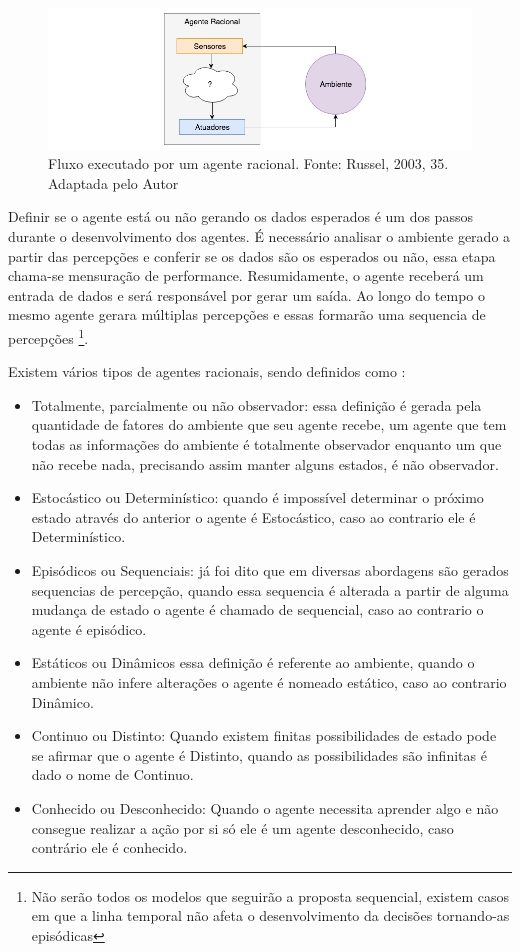 \begin{figure}
    \centering
    \includegraphics[width=.8\textwidth]{imagens/rational_agent_draw.png}
    \caption{Fluxo executado por um agente racional. Fonte: Russel, 2003, 35. Adaptada pelo Autor}
    \label{fig:rational_agent_draw}
\end{figure}

Definir se o agente está ou não gerando os dados esperados é um dos passos durante o desenvolvimento dos agentes. É necessário analisar o ambiente gerado a partir das percepções e conferir se os dados são os esperados ou não, essa etapa chama-se mensuração de performance. Resumidamente, o agente receberá um entrada de dados e será responsável por gerar um saída. Ao longo do tempo o mesmo agente gerara múltiplas percepções e essas formarão uma sequencia de percepções \footnote{Não serão todos os modelos que seguirão a proposta sequencial, existem casos em que a linha temporal não afeta o desenvolvimento da decisões tornando-as episódicas}.

Existem vários tipos de agentes racionais, sendo definidos como \cite[34-45]{russell2003artificial}:

\begin{itemize}
 \item Totalmente, parcialmente ou não observador: essa definição é gerada pela quantidade de fatores do ambiente que seu agente recebe, um agente que tem todas as informações do ambiente é totalmente observador enquanto um que não recebe nada, precisando assim manter alguns estados, é não observador.
 \item Estocástico ou Determinístico: quando é impossível determinar o próximo estado através do anterior o agente é Estocástico, caso ao contrario ele é Determinístico.
 \item Episódicos ou Sequenciais: já foi dito que em diversas abordagens são gerados sequencias de percepção, quando essa sequencia é alterada a partir de alguma mudança de estado o agente é chamado de sequencial, caso ao contrario o agente é episódico.
 \item Estáticos ou Dinâmicos essa definição é referente ao ambiente, quando o ambiente não infere alterações o agente é nomeado estático, caso ao contrario Dinâmico.
 \item Continuo ou Distinto: Quando existem finitas possibilidades de estado pode se afirmar que o agente é Distinto, quando as possibilidades são infinitas é dado o nome de Continuo.
 \item Conhecido ou Desconhecido: Quando o agente necessita aprender algo e não consegue realizar a ação por si só ele é um agente desconhecido, caso contrário ele é conhecido.
\end{itemize}

